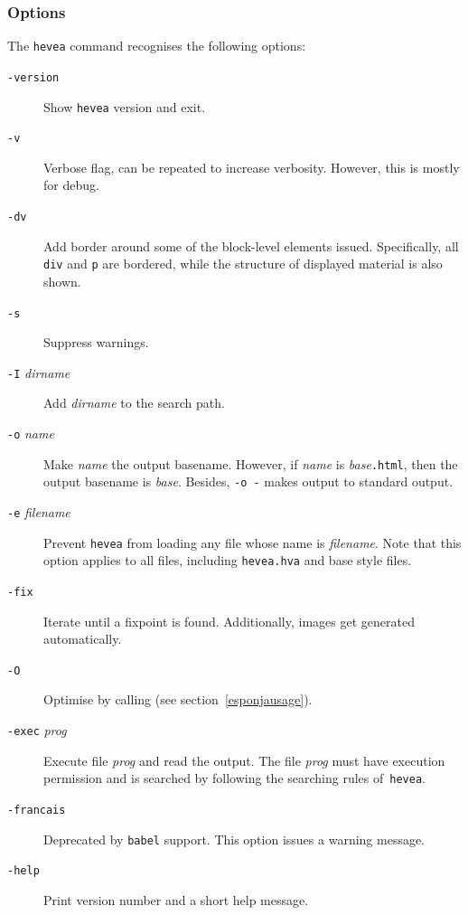 \subsubsection{\label{heveaoptions}Options}
The \texttt{hevea} command recognises the following options:
\begin{description}
\item[{\tt -version}] Show \texttt{hevea} version and exit.
\item[{\tt -v}] Verbose flag, can be repeated to increase
verbosity. However, this is mostly for debug.
\item[{\tt -dv}] Add border around some of the block-level
elements issued. Specifically, all \verb+div+ and \verb+p+ are bordered,
while the structure of displayed material is also shown.
\item[{\tt -s}] Suppress warnings.
\item[{\tt -I} {\it dirname}] Add {\it dirname} to the search path.
\item[{\tt -o} {\it name}] Make \textit{name} the output basename.
However, if \textit{name} is \textit{base}\texttt{.html}, then
the output basename is \textit{base}.
Besides, {\tt -o -} makes \hevea{} output to standard output.
\item[{\tt -e} {\it filename}] Prevent \texttt{hevea} from loading any file
whose name is \textit{filename}. Note that this option applies to all
files, including \texttt{hevea.hva} and base style files.
\item[{\tt -fix}] Iterate \hevea{} until a fixpoint is found.
Additionally, images get generated automatically.
\item[{\tt -O}] Optimise \html{} by calling \esponja{} (see
section~\ref{esponjausage}).
\item[{\tt -exec} {\it prog}] Execute file \textit{prog} and read the
output. The file \textit{prog} must have execution permission and is
searched by following the searching rules of~\texttt{hevea}.
\item[{\tt -francais}] Deprecated by \texttt{babel} support. This
option issues a warning message.
\item[{\tt -help}] Print version number and a short help message.
\end{description}

